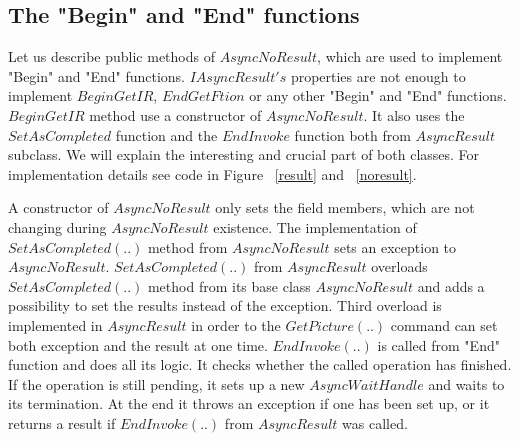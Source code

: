 \subsection*{The "Begin" and "End" functions} \label{sec:beginend}
  Let us describe public methods of $AsyncNoResult$, which are used to implement "Begin" and "End" functions.
  $IAsyncResult's$ properties are not enough to implement $BeginGetIR$,
  $EndGetFtion$ or any other "Begin" and "End" functions.
  $BeginGetIR$ method use a constructor of $AsyncNoResult$. It also uses the $SetAsCompleted$ function 
  and the $EndInvoke$ function both from $AsyncResult$ subclass.
  We will explain the interesting and crucial part of both classes. 
  For implementation details see code in Figure ~\ref{result} and ~\ref{noresult}.

  A constructor of $AsyncNoResult$ only sets the field members, 
  which are not changing during $AsyncNoResult$ existence.
  The implementation of $SetAsCompleted(..)$ method from $AsyncNoResult$ sets an exception to $AsyncNoResult$.
  $SetAsCompleted(..)$ from $AsyncResult$ overloads $SetAsCompleted(..)$ method
  from its base class $AsyncNoResult$ and adds a possibility to set the results instead of the exception.
  Third overload is implemented in $AsyncResult$ in order to the $GetPicture(..)$ command can set both 
  exception and the result at one time.
  $EndInvoke(..)$ is called from "End" function and does all its logic. It checks whether the called 
  operation has finished.	If the operation is still pending, it sets up a new $AsyncWaitHandle$
  and waits to its termination. At the end it throws an exception if one has been set up, 
  or it returns a result if $EndInvoke(..)$ from $AsyncResult$ was called.

